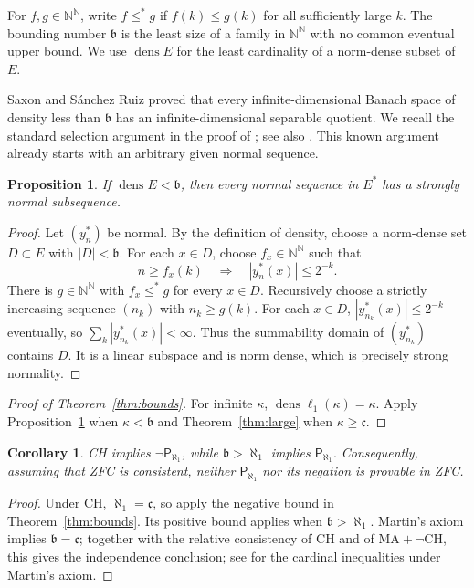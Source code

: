 \documentclass[11pt,a4paper]{amsart}
\newtheorem{proposition}[theorem]{Proposition}
\newtheorem{corollary}[theorem]{Corollary}
\theoremstyle{remark}
\newcommand{\N}{\mathbb N}
\newcommand{\cfrak}{\mathfrak c}
\DeclareMathOperator{\dens}{dens}
\begin{document}
For $f,g\in\N^{\N}$, write $f\leqslant^*g$ if $f(k)\leqslant g(k)$
for all sufficiently large $k$. The bounding number $\mathfrak b$ is
the least size of a family in $\N^{\N}$ with no common eventual upper
bound. We use $\dens E$ for the least cardinality of a norm-dense
subset of $E$.

Saxon and S\'anchez Ruiz \cite[Theorem~3]{SSR} proved that every
infinite-dimensional Banach space of density less than $\mathfrak b$
has an infinite-dimensional separable quotient. We recall the standard
selection argument in the proof of \cite[Corollary~11]{FKLS}; see also
\cite[proof of Theorem~2.1]{Brech}. This known argument already starts
with an arbitrary given normal sequence.

\begin{proposition}\label{prop:small}
If $\dens E<\mathfrak b$, then every normal sequence in $E^*$ has a
strongly normal subsequence.
\end{proposition}

\begin{proof}
Let $(y_n^*)$ be normal. By the definition of density, choose a
norm-dense set $D\subset E$ with $|D|<\mathfrak b$. For each $x\in D$,
choose $f_x\in\N^{\N}$ such that
\[
 n\geqslant f_x(k)\quad\Longrightarrow\quad
 |y_n^*(x)|\leqslant2^{-k}.
\]
There is $g\in\N^{\N}$ with $f_x\leqslant^*g$ for every $x\in D$.
Recursively choose a strictly increasing sequence $(n_k)$ with
$n_k\geqslant g(k)$. For each $x\in D$,
$|y_{n_k}^*(x)|\leqslant2^{-k}$ eventually, so
$\sum_k|y_{n_k}^*(x)|<\infty$. Thus the summability domain of
$(y_{n_k}^*)$ contains $D$. It is a linear subspace and is norm dense,
which is precisely strong normality.
\end{proof}

\begin{proof}[Proof of Theorem~\ref{thm:bounds}]
For infinite $\kappa$, $\dens\ell_1(\kappa)=\kappa$. Apply
Proposition~\ref{prop:small} when $\kappa<\mathfrak b$ and
Theorem~\ref{thm:large} when $\kappa\geqslant\cfrak$.
\end{proof}

\begin{corollary}\label{cor:independence}
CH implies $\neg\mathsf P_{\aleph_1}$, while
$\mathfrak b>\aleph_1$ implies $\mathsf P_{\aleph_1}$.
Consequently, assuming that ZFC is consistent, neither
$\mathsf P_{\aleph_1}$ nor its negation is provable in ZFC.
\end{corollary}

\begin{proof}
Under CH, $\aleph_1=\cfrak$, so apply the negative bound in
Theorem~\ref{thm:bounds}. Its positive bound applies when
$\mathfrak b>\aleph_1$. Martin's axiom implies
$\mathfrak b=\cfrak$; together with the relative consistency of CH
and of $\mathrm{MA}+\neg\mathrm{CH}$, this gives the independence
conclusion; see \cite[Section~6]{Blass} for the cardinal inequalities
under Martin's axiom.
\end{proof}
\end{document}
